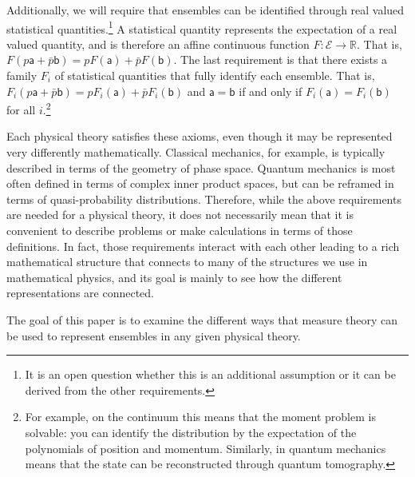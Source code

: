 \documentclass[10pt,twocolumn, nofootinbib]{revtex4-2}
\newcommand{\ens}[1][e] {\mathsf{#1}} %
\newcommand{\Ens}[1][E] {\mathcal{#1}} %
\begin{document}
Additionally, we will require that ensembles can be identified through real valued statistical quantities.\footnote{It is an open question whether this is an additional assumption or it can be derived from the other requirements.} A statistical quantity represents the expectation of a real valued quantity, and is therefore an affine continuous function $F : \Ens \to \mathbb{R}$. That is, $F(p \ens[a] + \bar{p} \ens[b]) = p F(\ens[a]) + \bar{p} F(\ens[b])$. The last requirement is that there exists a family $F_i$ of statistical quantities that fully identify each ensemble. That is, $F_i(p \ens[a] + \bar{p} \ens[b]) = p F_i(\ens[a]) + \bar{p} F_i(\ens[b])$ and $\ens[a] = \ens[b]$ if and only if $F_i(\ens[a]) = F_i(\ens[b])$ for all $i$.\footnote{For example, on the continuum this means that the moment problem is solvable: you can identify the distribution by the expectation of the polynomials of position and momentum. Similarly, in quantum mechanics means that the state can be reconstructed through quantum tomography.}

Each physical theory satisfies these axioms, even though it may be represented very differently mathematically. Classical mechanics, for example, is typically described in terms of the geometry of phase space. Quantum mechanics is most often defined in terms of complex inner product spaces, but can be reframed in terms of quasi-probability distributions. Therefore, while the above requirements are needed for a physical theory, it does not necessarily mean that it is convenient to describe problems or make calculations in terms of those definitions. In fact, those requirements interact with each other leading to a rich mathematical structure that connects to many of the structures we use in mathematical physics, and its goal is mainly to see how the different representations are connected.

The goal of this paper is to examine the different ways that measure theory can be used to represent ensembles in any given physical theory.

\end{document}
